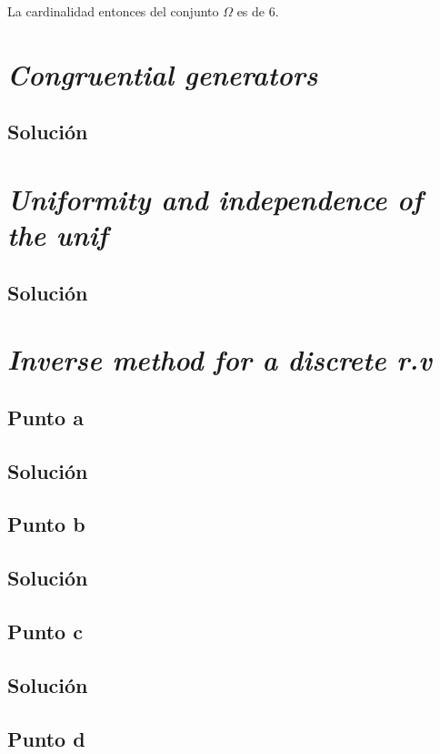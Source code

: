 \documentclass[12pt]{article}
\begin{document}
La cardinalidad entonces del conjunto \(\Omega\) es de 6.




\section{\textit{Congruential generators}}
\subsection{Solución}

\section{\textit{Uniformity and independence of the unif}}
\subsection{Solución}

\section{\textit{Inverse method for a discrete r.v}}

\subsection{Punto a}
\subsection{Solución}

\subsection{Punto b}
\subsection{Solución}

\subsection{Punto c}
\subsection{Solución}

\subsection{Punto d}
\end{document}
